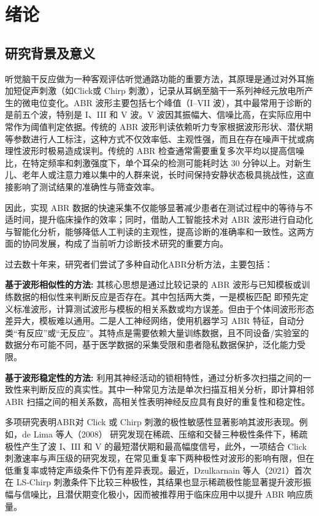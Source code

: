\chapter{绪论}

\section{研究背景及意义}
听觉脑干反应做为一种客观评估听觉通路功能的重要方法，其原理是通过对外耳施加短促声刺激（如Click或 Chirp 刺激），记录从耳蜗至脑干一系列神经元放电所产生的微电位变化。ABR 波形主要包括七个峰值（I–VII 波），其中最常用于诊断的是前五个波，特别是 I、III 和 V 波。V 波因其振幅大、信噪比高，在实际应用中常作为阈值判定依据。传统的 ABR 波形判读依赖听力专家根据波形形状、潜伏期等参数进行人工标注，这种方式不仅效率低、主观性强，而且在存在噪声干扰或病理性波形时极易造成误判。传统的 ABR 检查通常需要重复多次平均以提高信噪比，在特定频率和刺激强度下，单个耳朵的检测可能耗时达 30 分钟以上。对新生儿、老年人或注意力难以集中的人群来说，长时间保持安静状态极具挑战性，这直接影响了测试结果的准确性与筛查效率。

因此，实现 ABR 数据的快速采集不仅能够显著减少患者在测试过程中的等待与不适时间，提升临床操作的效率；同时，借助人工智能技术对 ABR 波形进行自动化与智能化分析，能够降低人工判读的主观性，提高诊断的准确率和一致性。这两方面的协同发展，构成了当前听力诊断技术研究的重要方向。

过去数十年来，研究者们尝试了多种自动化ABR分析方法，主要包括：

\textbf{基于波形相似性的方法:}
其核心思想是通过比较记录的 ABR 波形与已知模板或训练数据的相似性来判断反应是否存在。其中包括两大类，一是模板匹配\cite{valderrama2014} 即预先定义标准波形，计算测试波形与模板的相关系数或均方误差。但由于个体间波形形态差异大，模板难以通用。二是人工神经网络，使用机器学习 ABR 特征，自动分类“有反应”或“无反应”。其特点是需要依赖大量训练数据，且不同设备/实验室的数据分布可能不同，基于医学数据的采集受限和患者隐私数据保护，泛化能力受限。

\textbf{基于波形稳定性的方法:}
利用其神经活动的锁相特性，通过分析多次扫描之间的一致性来判断反应的真实性。其中一种常见方法是单次扫描互相关分析，即计算相邻 ABR 扫描之间的相关系数，高相关性表明神经反应具有良好的重复性和稳定性。

多项研究表明ABR对 Click 或 Chirp 刺激的极性敏感性显著影响其波形表现。例如，de Lima 等人（2008）\cite{delima2008polarity} 研究发现在稀疏、压缩和交替三种极性条件下，稀疏极性产生了波 I、III 和 V 的最短潜伏期和最高幅度信号，此外，一项结合 Click 刺激速率与声压级的研究发现，在常见重复率下两种极性对波形的影响有限，但在低重复率或特定声级条件下仍有差异表现。最近，Dzulkarnain 等人（2021）\cite{dzulkarnain2021influence}首次在 LS‑Chirp 刺激条件下比较三种极性，其结果也显示稀疏极性能显著提升波形振幅与信噪比，且潜伏期变化极小，因而被推荐用于临床应用中以提升 ABR 响应质量。

